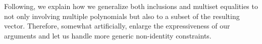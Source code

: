 Following, we explain how we generalize both inclusions and multiset equalities to not only involving multiple polynomials but also to a subset of the resulting vector. Therefore, somewhat artificially, enlarge the expressiveness of our arguments and let us handle more generic non-identity constraints.
%
%

